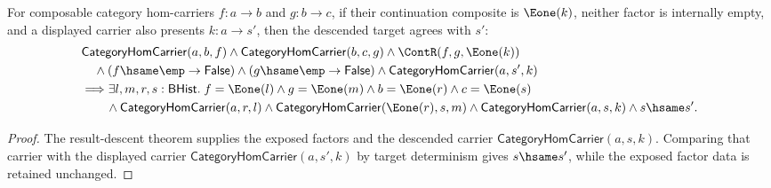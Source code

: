 \begin{theorem}
\label{thm:category-comp-nonempty-e1-morphism-result-descent-unique}
For composable category hom-carriers $f:a\to b$ and $g:b\to c$, if their
continuation composite is $\Eone(k)$, neither factor is internally empty, and a
displayed carrier also presents $k:a\to s'$, then the descended target agrees
with $s'$:
$$
\begin{aligned}
&\mathsf{CategoryHomCarrier}(a,b,f)\land
\mathsf{CategoryHomCarrier}(b,c,g)\land
\ContR(f,g,\Eone(k))\\
&\quad\land (f\hsame\emp\to\mathsf{False})\land
(g\hsame\emp\to\mathsf{False})\land
\mathsf{CategoryHomCarrier}(a,s',k)\\
&\Longrightarrow
\exists l,m,r,s:\mathsf{BHist}.\;
f=\Eone(l)\land g=\Eone(m)\land b=\Eone(r)\land c=\Eone(s)\\
&\qquad\land\mathsf{CategoryHomCarrier}(a,r,l)\land
\mathsf{CategoryHomCarrier}(\Eone(r),s,m)\land
\mathsf{CategoryHomCarrier}(a,s,k)\land s\hsame s'.
\end{aligned}
$$
\end{theorem}
\begin{proof}
The result-descent theorem supplies the exposed factors and the descended
carrier $\mathsf{CategoryHomCarrier}(a,s,k)$. Comparing that carrier with the
displayed carrier $\mathsf{CategoryHomCarrier}(a,s',k)$ by target determinism
gives $s\hsame s'$, while the exposed factor data is retained unchanged.
\end{proof}

